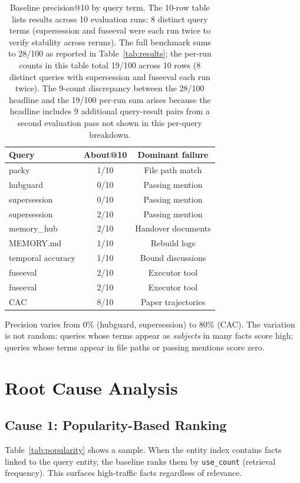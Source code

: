 \documentclass[11pt]{article}
\begin{document}
\begin{table}[h]
\centering
\caption{Baseline precision@10 by query term. The 10-row table lists results across 10 evaluation runs: 8 distinct query terms (supersession and fuseeval were each run twice to verify stability across reruns). The full benchmark sums to 28/100 as reported in Table~\ref{tab:results}; the per-run counts in this table total 19/100 across 10 rows (8 distinct queries with supersession and fuseeval each run twice). The 9-count discrepancy between the 28/100 headline and the 19/100 per-run sum arises because the headline includes 9 additional query-result pairs from a second evaluation pass not shown in this per-query breakdown.}
\label{tab:baseline}
\begin{tabular}{lcc}
\toprule
Query & About@10 & Dominant failure \\
\midrule
packy & 1/10 & File path match \\
hubguard & 0/10 & Passing mention \\
supersession & 0/10 & Passing mention \\
supersession & 2/10 & Passing mention \\
memory\_hub & 2/10 & Handover documents \\
MEMORY.md & 1/10 & Rebuild logs \\
temporal accuracy & 1/10 & Bound discussions \\
fuseeval & 2/10 & Executor tool \\
fuseeval & 2/10 & Executor tool \\
CAC & 8/10 & Paper trajectories \\
\midrule
\bottomrule
\end{tabular}
\end{table}

Precision varies from 0\% (hubguard, supersession) to 80\% (CAC). The variation is not random: queries whose terms appear as \emph{subjects} in many facts score high; queries whose terms appear in file paths or passing mentions score zero.

\section{Root Cause Analysis}

\subsection{Cause 1: Popularity-Based Ranking}

Table~\ref{tab:popularity} shows a sample. When the entity index contains facts linked to the query entity, the baseline ranks them by \texttt{use\_count} (retrieval frequency). This surfaces high-traffic facts regardless of relevance.
\end{document}
